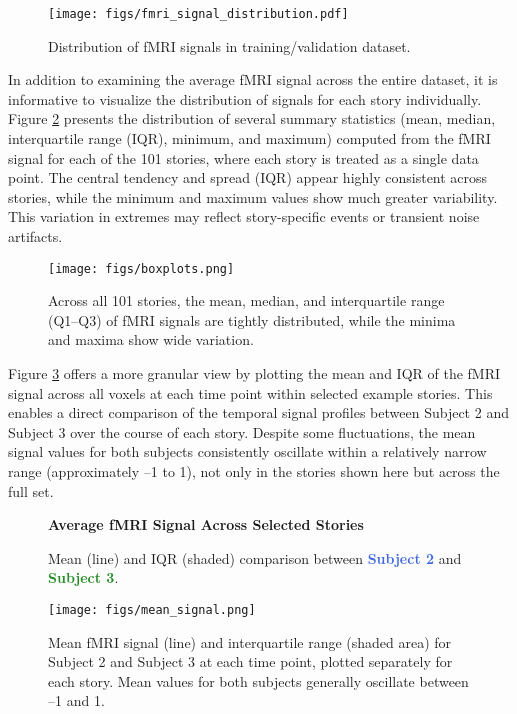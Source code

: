 \documentclass[10pt,letterpaper]{article}
\begin{document}
\begin{figure}[ht]
    \centering
    \texttt{[image: figs/fmri\_signal\_distribution.pdf]}
    \caption{Distribution of fMRI signals in training/validation dataset.}
    \label{fig:fmri_signal}
\end{figure}

In addition to examining the average fMRI signal across the entire dataset, it is informative to visualize the distribution of signals for each story individually. Figure \ref{fig:boxplots} presents the distribution of several summary statistics (mean, median, interquartile range (IQR), minimum, and maximum) computed from the fMRI signal for each of the 101 stories, where each story is treated as a single data point. The central tendency and spread (IQR) appear highly consistent across stories, while the minimum and maximum values show much greater variability. This variation in extremes may reflect story-specific events or transient noise artifacts.

\begin{figure}[ht]
    \centering
    \texttt{[image: figs/boxplots.png]}
    \caption{Across all 101 stories, the mean, median, and interquartile range (Q1–Q3) of fMRI signals are tightly distributed, while the minima and maxima show wide variation.}
    \label{fig:boxplots}
\end{figure}

Figure \ref{fig:mean_signal} offers a more granular view by plotting the mean and IQR of the fMRI signal across all voxels at each time point within selected example stories. This enables a direct comparison of the temporal signal profiles between Subject 2 and Subject 3 over the course of each story. Despite some fluctuations, the mean signal values for both subjects consistently oscillate within a relatively narrow range (approximately –1 to 1), not only in the stories shown here but across the full set.

\begin{figure}[ht]
    \centering
    \parbox{\textwidth}{\centering 
        \fontsize{13pt}{13pt}\selectfont \textbf{Average fMRI Signal Across Selected Stories}
        
        {\fontsize{11pt}{13pt}\selectfont Mean (line) and IQR (shaded) comparison between   \textcolor{RoyalBlue}{\textbf{Subject 2}} and \textcolor{ForestGreen}{\textbf{Subject 3}}.} 
    }
    \texttt{[image: figs/mean\_signal.png]}
    \caption{Mean fMRI signal (line) and interquartile range (shaded area) for Subject 2 and Subject 3 at each time point, plotted separately for each story. Mean values for both subjects generally oscillate between –1 and 1.}
    \label{fig:mean_signal}
\end{figure}
\end{document}
